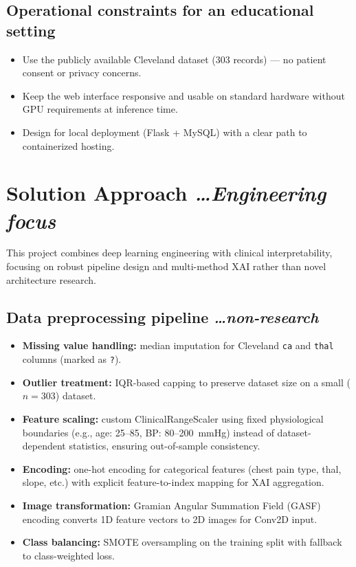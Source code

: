 \documentclass[11pt,a4paper]{article}
\newcommand{\BvrHint}[1]{%
  {\normalfont\normalsize\itshape\hfill #1}}
\begin{document}
\subsection{Operational constraints for an educational setting}
\begin{itemize}[leftmargin=0.7cm]
    \item Use the publicly available Cleveland dataset (303 records)
      --- no patient consent or privacy concerns.
    \item Keep the web interface responsive and usable on standard
      hardware without GPU requirements at inference time.
    \item Design for local deployment (Flask + MySQL) with a clear
      path to containerized hosting.
\end{itemize}

\section{Solution Approach%
  \BvrHint{\ldots Engineering focus}}
This project combines deep learning engineering with clinical
interpretability, focusing on robust pipeline design and
multi-method XAI rather than novel architecture research.

\subsection{Data preprocessing pipeline%
  \BvrHint{\ldots non-research}}
\begin{itemize}[leftmargin=0.7cm]
    \item \textbf{Missing value handling:} median imputation for
      Cleveland \texttt{ca} and \texttt{thal} columns (marked as
      \texttt{?}).
    \item \textbf{Outlier treatment:} IQR-based capping to preserve
      dataset size on a small ($n=303$) dataset.
    \item \textbf{Feature scaling:} custom ClinicalRangeScaler using
      fixed physiological boundaries (e.g., age: 25--85, BP:
      80--200~mmHg) instead of dataset-dependent statistics,
      ensuring out-of-sample consistency.
    \item \textbf{Encoding:} one-hot encoding for categorical
      features (chest pain type, thal, slope, etc.) with explicit
      feature-to-index mapping for XAI aggregation.
    \item \textbf{Image transformation:} Gramian Angular Summation
      Field (GASF) encoding converts 1D feature vectors to 2D
      images for Conv2D input.
    \item \textbf{Class balancing:} SMOTE oversampling on the
      training split with fallback to class-weighted loss.
\end{itemize}
\end{document}
